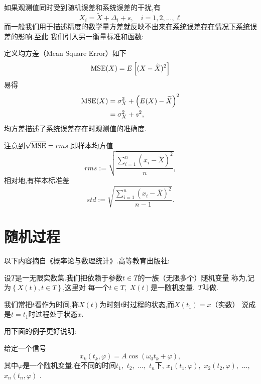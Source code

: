 \documentclass[cn,10pt,citestyle=gb7714-2015,bibstyle=gb7714-2015]{elegantbook}
\newcommand{\MSE}{\textup{MSE}}
\renewcommand{\l}{\ell}
\begin{document}
如果观测值同时受到随机误差和系统误差的干扰,有
\[
    X_i=\widetilde{X}+\varDelta_i+s,\quad i=1,2,...,\l
\]
而一般我们用于描述精度的数学量\colorbox{yellow!20}{方差}就反映不出来\underline{在系统误差存在情况下系统误差的影响}.至此
我们引入另一衡量标准和函数:
\begin{definition}[准确度和均方差]\label{def:accuracy-MSE}
  定义均方差（Mean Square Error）如下
  \begin{equation}\label{eq:MSE}
    \MSE(X)=E\left[(X-\widetilde{X})^2\right]
  \end{equation}
  易得
  \begin{align}
    \MSE(X)&=\sigma_X^2+\left(E(X)-\widetilde{X}\right)^2\\
    &=\sigma_X^2+s^2,
  \end{align}
  均方差描述了系统误差存在时观测值的准确度.
\end{definition}
\begin{note}
  注意到$\sqrt{\MSE}=rms$,即样本均方值
  \begin{equation}
    rms:=\sqrt{\frac{\sum_{i=1}^n(x_i-\widetilde{X})^2}{n}},
  \end{equation}
  相对地,有样本标准差
  \begin{equation}
    std:=\sqrt{\frac{\sum_{i=1}^n(x_i-\overline{X})^2}{n-1}}.
  \end{equation}
\end{note}
\section{随机过程}
以下内容摘自《概率论与数理统计》.高等教育出版社:
\begin{definition}[随机过程]\label{def:randprocess}
  设$T$是一无限实数集.我们把依赖于参数$t\in T$的一族（无限多个）随机变量
  称为,记为$\left\{X(t),t\in T\right\}$,这里对
  每一个$t\in T$,\ $X(t)$是一随机变量.\ $T$叫做.

  我们常把$t$看作为时间,称$X(t)$为时刻$t$时过程的状态,而$X(t_1)=x$（实数）
  说成是$t=t_1$时过程处于状态$x$.
\end{definition}
用下面的例子更好说明:
\begin{example}
  给定一个信号
  \[
      x_k(t_k,\varphi)=A\cos(\omega_0t_k+\varphi),
  \]  
  其中\colorbox{yellow!20}{$\varphi$是一个随机变量},在不同的时间$t_1$,\ $t_2$,\ $...$,\ $t_n$下,
  $x_1(t_1,\varphi)$,\ $x_2(t_2,\varphi)$,\ $\ldots$,\ $x_n(t_n,\varphi)$
  .
\end{example}
\end{document}
